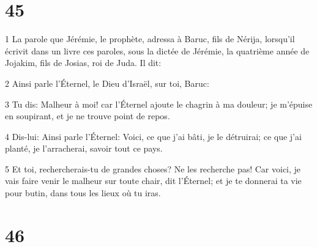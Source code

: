 \chapter{45}

\par 1 La parole que Jérémie, le prophète, adressa à Baruc, fils de Nérija, lorsqu'il écrivit dans un livre ces paroles, sous la dictée de Jérémie, la quatrième année de Jojakim, fils de Josias, roi de Juda. Il dit:
\par 2 Ainsi parle l'Éternel, le Dieu d'Israël, sur toi, Baruc:
\par 3 Tu dis: Malheur à moi! car l'Éternel ajoute le chagrin à ma douleur; je m'épuise en soupirant, et je ne trouve point de repos.
\par 4 Dis-lui: Ainsi parle l'Éternel: Voici, ce que j'ai bâti, je le détruirai; ce que j'ai planté, je l'arracherai, savoir tout ce pays.
\par 5 Et toi, rechercherais-tu de grandes choses? Ne les recherche pas! Car voici, je vais faire venir le malheur sur toute chair, dit l'Éternel; et je te donnerai ta vie pour butin, dans tous les lieux où tu iras.

\chapter{46}

